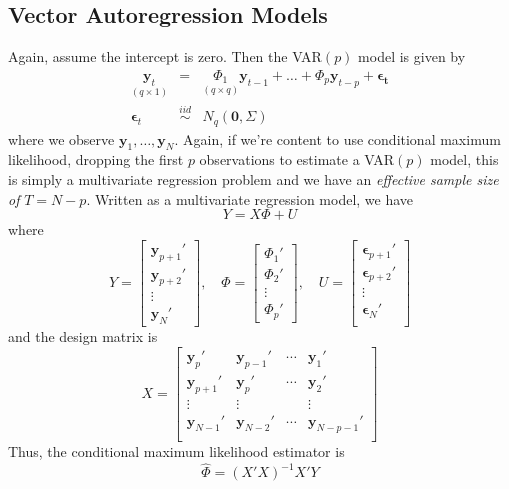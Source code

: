\documentclass[12pt]{article}
\theoremstyle{definition}
\begin{document}
\subsection{Vector Autoregression Models}
Again, assume the intercept is zero. Then the VAR$(p)$ model is given by
	\begin{eqnarray*}
		\underset{(q\times 1)}{\textbf{y}_t} &=& \underset{(q\times q)}{\Phi_1} \textbf{y}_{t-1} + \hdots + \Phi_{p}\textbf{y}_{t-p} + \boldsymbol{\epsilon_t}\\
		\boldsymbol{\epsilon}_t &\overset{iid}{\sim}& N_q(\mathbf{0}, \Sigma)
	\end{eqnarray*}
where we observe $\mathbf{y}_1, \hdots, \mathbf{y}_N$. Again, if we're content to use conditional maximum likelihood, dropping the first $p$ observations to estimate a VAR$(p)$ model, this is simply a multivariate regression problem and we have an \emph{effective sample size of} $T = N-p$. Written as a multivariate regression model, we have 
	$$Y = X\Phi  + U$$
where 
	$$
	Y = \left[\begin{array}
		{c} \textbf{y}_{p+1}' \\ \textbf{y}_{p+2}' \\
		\vdots \\ \textbf{y}_{N}' 
	\end{array} \right],\quad
	\Phi = \left[\begin{array}
		{c} \Phi_1' \\ \Phi_2' \\ \vdots \\ \Phi_p'
	\end{array} \right],\quad
	U = \left[\begin{array}
		{c} \boldsymbol{\epsilon}_{p+1}' \\ 
		\boldsymbol{\epsilon}_{p+2}' \\ 
		\vdots \\ 
		\boldsymbol{\epsilon}_{N}' \\ 
	\end{array} \right]
	$$
and the design matrix is
$$X = \left[\begin{array}
		{cccc}
		\textbf{y}_p' & \textbf{y}_{p-1}' & \cdots & \textbf{y}_{1}'\\
		\textbf{y}_{p+1}' & \textbf{y}_{p}' & \cdots & \textbf{y}_{2}'\\
		\vdots & \vdots & &\vdots \\
		\textbf{y}_{N-1}' & \textbf{y}_{N-2}' & \cdots & \textbf{y}_{N-p-1}'\\
	\end{array} \right]$$
Thus, the conditional maximum likelihood estimator is
	$$\widehat{\Phi} = (X'X)^{-1} X'Y$$
\end{document}
